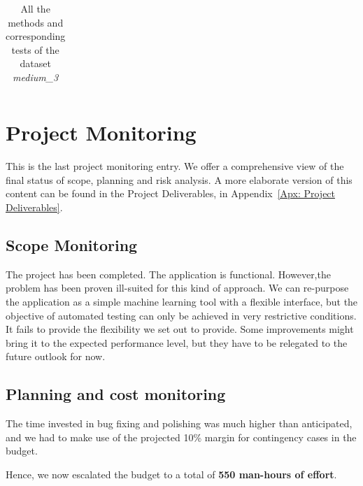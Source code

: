 \documentclass[a4paper, 11pt]{report}
\begin{document}
\begin{xltabular}{1.0\textwidth}{|c|X|}
\caption{All the methods and corresponding tests of the dataset \textit{medium\_3}}
\label{tab: data_reference }
\end{xltabular}

\chapter{Project Monitoring}
This is the last project monitoring entry. We offer a comprehensive view of the final status of scope, planning and risk analysis. A more elaborate version of this content can be found in the Project Deliverables, in Appendix~\ref{Apx: Project Deliverables}.
\section{Scope Monitoring}
The project has been completed. The application is functional. However,the problem has been proven ill-suited for this kind of approach. We can re-purpose the application as a simple machine learning tool with a flexible interface, but the objective of automated testing can only be achieved in very restrictive conditions. It fails to provide the flexibility we set out to provide. Some improvements might bring it to the expected performance level, but they have to be relegated to the future outlook for now.

\section{Planning and cost monitoring}
The time invested in bug fixing and polishing was much higher than anticipated, and we had to make use of the projected 10\% margin for contingency cases in the budget.

Hence, we now escalated the budget to a total of \textbf{550 man-hours of effort}.
\end{document}
